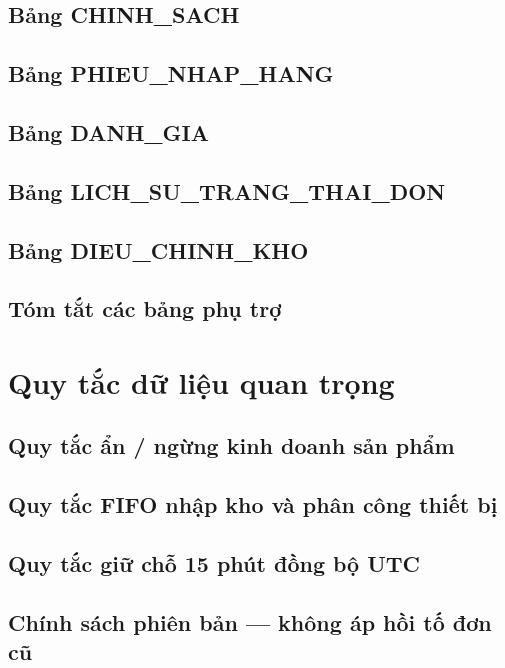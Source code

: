 \subsection{Bảng CHINH\_SACH}

\subsection{Bảng PHIEU\_NHAP\_HANG}

\subsection{Bảng DANH\_GIA}

\subsection{Bảng LICH\_SU\_TRANG\_THAI\_DON}

\subsection{Bảng DIEU\_CHINH\_KHO}

\subsection{Tóm tắt các bảng phụ trợ}

\section{Quy tắc dữ liệu quan trọng}
\label{sec:quy_tac_du_lieu}

\subsection{Quy tắc ẩn / ngừng kinh doanh sản phẩm}

\subsection{Quy tắc FIFO nhập kho và phân công thiết bị}

\subsection{Quy tắc giữ chỗ 15 phút đồng bộ UTC}

\subsection{Chính sách phiên bản --- không áp hồi tố đơn cũ}

